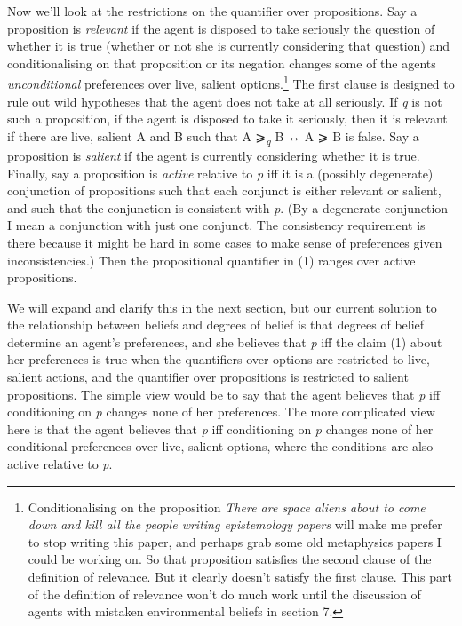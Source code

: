 \documentclass[
  11pt,
  letterpaper,
  DIV=11,
  numbers=noendperiod,
  twoside]{scrartcl}
\begin{document}
Now we'll look at the restrictions on the quantifier over propositions.
Say a proposition is \emph{relevant} if the agent is disposed to take
seriously the question of whether it is true (whether or not she is
currently considering that question) and conditionalising on that
proposition or its negation changes some of the agents
\emph{unconditional} preferences over live, salient options.\footnote{Conditionalising
  on the proposition \emph{There are space aliens about to come down and
  kill all the people writing epistemology papers} will make me prefer
  to stop writing this paper, and perhaps grab some old metaphysics
  papers I could be working on. So that proposition satisfies the second
  clause of the definition of relevance. But it clearly doesn't satisfy
  the first clause. This part of the definition of relevance won't do
  much work until the discussion of agents with mistaken environmental
  beliefs in section 7.} The first clause is designed to rule out wild
hypotheses that the agent does not take at all seriously. If \emph{q} is
not such a proposition, if the agent is disposed to take it seriously,
then it is relevant if there are live, salient A and B such that A
⩾\textsubscript{\emph{q}} B ↔︎ A ⩾ B is false. Say a proposition is
\emph{salient} if the agent is currently considering whether it is true.
Finally, say a proposition is \emph{active} relative to \emph{p} iff it
is a (possibly degenerate) conjunction of propositions such that each
conjunct is either relevant or salient, and such that the conjunction is
consistent with \emph{p}. (By a degenerate conjunction I mean a
conjunction with just one conjunct. The consistency requirement is there
because it might be hard in some cases to make sense of preferences
given inconsistencies.) Then the propositional quantifier in (1) ranges
over active propositions.

We will expand and clarify this in the next section, but our current
solution to the relationship between beliefs and degrees of belief is
that degrees of belief determine an agent's preferences, and she
believes that \emph{p} iff the claim (1) about her preferences is true
when the quantifiers over options are restricted to live, salient
actions, and the quantifier over propositions is restricted to salient
propositions. The simple view would be to say that the agent believes
that \emph{p} iff conditioning on \emph{p} changes none of her
preferences. The more complicated view here is that the agent believes
that \emph{p} iff conditioning on \emph{p} changes none of her
conditional preferences over live, salient options, where the conditions
are also active relative to \emph{p}.
\end{document}
